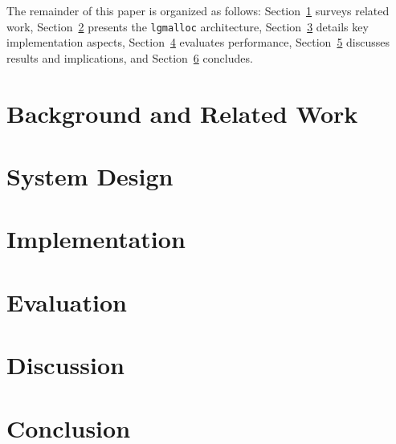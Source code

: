 \documentclass[sigconf,authordraft]{acmart}
\begin{document}
The remainder of this paper is organized as follows: Section~\ref{sec:background}
surveys related work, Section~\ref{sec:design} presents the \texttt{lgmalloc}
architecture, Section~\ref{sec:implementation} details key implementation aspects,
Section~\ref{sec:evaluation} evaluates performance, Section~\ref{sec:discussion}
discusses results and implications, and Section~\ref{sec:conclusion} concludes.

\section{Background and Related Work}
\label{sec:background}

\section{System Design}
\label{sec:design}

\section{Implementation}
\label{sec:implementation}

\section{Evaluation}
\label{sec:evaluation}

\section{Discussion}
\label{sec:discussion}

\section{Conclusion}
\label{sec:conclusion}



\end{document}

